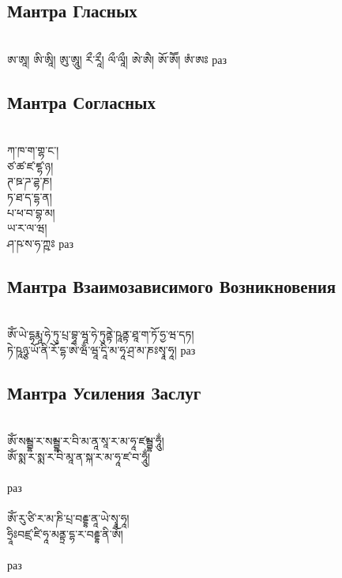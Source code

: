 \subsection*{Мантра Гласных}
\\
\ti
ཨ་ཨཱ། ཨི་ཨཱི། ཨུ་ཨཱུ། རྀ་རཱྀ། ལྀ་ལཱྀ། ཨེ་ཨཻ། ཨོ་ཨཽ། ཨཾ་ཨཿ
 раз

\subsection*{Мантра Согласных}
\\
\ti
ཀ་ཁ་ག་གྷ་ང་། \\
ཙ་ཚ་ཛ་ཛྷ་ཉ། \\
ཊ་ཋ་ཌ་ཌྷ་ཎ། \\
ཏ་ཐ་ད་དྷ་ན། \\
པ་ཕ་བ་བྷ་མ། \\
ཡ་ར་ལ་ཝ། \\
ཤ་ཥ་ས་ཧ་ཀྵཿ 
 раз

\subsection*{Мантра Взаимозависимого Возникновения}
\\
\ti
ཨོཾ་ཡེ་དྷརྨཱ་ཧེ་ཏུ་པྲ་བྷཱ་ཝཱ་ཧེ་ཏུནྟེ་ཥཱནྟ་ཐཱ་ག་ཏོ་ཧྱ་ཝ་དཏ།\\
 ཏེ་ཥཱཉྩ་ཡོ་ནི་རོ་དྷ་ཨེ་ཝྃ་ཝཱ་དཱི་མ་ཧཱ་ཤྲ་མ་ཎཿསྭཱ་ཧཱ།
 раз

\subsection*{Мантра Усиления Заслуг}
\\
\ti
ཨོཾ་སམྦྷ་ར་སམྦྷ་ར་བི་མ་ནཱ་སཱ་ར་མ་ཧཱ་ཛམྦྷ་ཧཱུྂ།\\
ཨོཾ་སྨ་ར་སྨ་ར་བི་མཱ་ན་སྐ་ར་མ་ཧཱ་ཛ་བ་ཧཱུྂ།\\
\\
 раз\\
\\
\ti
ཨོཾ་རུ་ཙི་ར་མ་ཎི་པྲ་བརྡྷ་ནཱ་ཡེ་སྭཱ་ཧཱ།\\
ཧྲཱིཿབཛྲ་ཛི་ཧཱ་མནྟྲ་དྷ་ར་བརྡྷ་ནི་ཨོཾ།\\
\\
 раз
